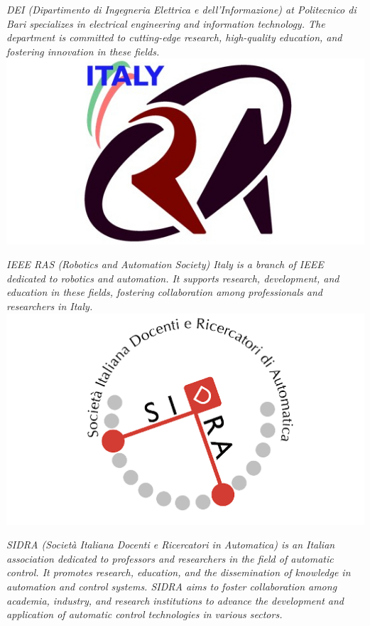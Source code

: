 \documentclass[
	openany, %
	parskip=full, %
	12pt, %
	a4paper, %
]{conferencebooklet} %
\begin{document}
\begin{multicols*}{2}
    \textit{DEI (Dipartimento di Ingegneria Elettrica e dell'Informazione) at Politecnico di Bari specializes in electrical engineering and information technology. The department is committed to cutting-edge research, high-quality education, and fostering innovation in these fields.} \\
        
    \hfill\includegraphics[width=\sponsorscaling\linewidth]{logos/ras-italy.jpeg}\hspace*{\fill}

    \textit{IEEE RAS (Robotics and Automation Society) Italy is a branch of IEEE dedicated to robotics and automation. It supports research, development, and education in these fields, fostering collaboration among professionals and researchers in Italy.} \\

    \hfill\includegraphics[width=\sponsorscaling\linewidth]{logos/sidra.png}\hspace*{\fill}

    \textit{SIDRA (Società Italiana Docenti e Ricercatori in Automatica) is an Italian association dedicated to professors and researchers in the field of automatic control. It promotes research, education, and the dissemination of knowledge in automation and control systems. SIDRA aims to foster collaboration among academia, industry, and research institutions to advance the development and application of automatic control technologies in various sectors.} \\
    

\end{multicols*}
\end{document}
